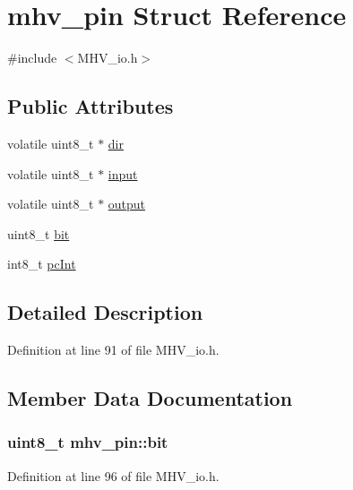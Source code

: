 \hypertarget{structmhv__pin}{
\section{mhv\-\_\-pin \-Struct \-Reference}
\label{structmhv__pin}
}


{\ttfamily \#include $<$\-M\-H\-V\-\_\-io.\-h$>$}

\subsection*{\-Public \-Attributes}
\begin{DoxyCompactItemize}
\item 
volatile uint8\-\_\-t $\ast$ \hyperlink{structmhv__pin_af92bee18d70be924e19ce2d2a6a7b14c}{dir}
\item 
volatile uint8\-\_\-t $\ast$ \hyperlink{structmhv__pin_a7c545d8bf340b11c799df9bc2c998076}{input}
\item 
volatile uint8\-\_\-t $\ast$ \hyperlink{structmhv__pin_a5c5f34f91b6586d0603e9568900f8423}{output}
\item 
uint8\-\_\-t \hyperlink{structmhv__pin_a6e630b4b7c21827dd791ba0fd68f5c57}{bit}
\item 
int8\-\_\-t \hyperlink{structmhv__pin_a10252efa71e71a7e0e5ddb1d184c7101}{pc\-Int}
\end{DoxyCompactItemize}


\subsection{\-Detailed \-Description}


\-Definition at line 91 of file \-M\-H\-V\-\_\-io.\-h.



\subsection{\-Member \-Data \-Documentation}
\hypertarget{structmhv__pin_a6e630b4b7c21827dd791ba0fd68f5c57}{
\subsubsection[{bit}]{\setlength{\rightskip}{0pt plus 5cm}uint8\-\_\-t {\bf mhv\-\_\-pin\-::bit}}}
\label{structmhv__pin_a6e630b4b7c21827dd791ba0fd68f5c57}


\-Definition at line 96 of file \-M\-H\-V\-\_\-io.\-h.

